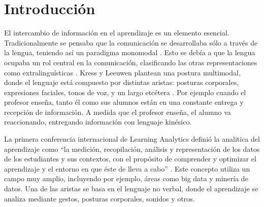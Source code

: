 \chapter{Introducción}

El intercambio de información en el aprendizaje es un elemento esencial. Tradicionalmente se pensaba que la comunicación se desarrollaba sólo a través de la lengua, teniendo así un paradigma monomodal \cite{ref1}. Esto se debía a que la lengua ocupaba un rol central en la comunicación, clasificando las otras representaciones como extralinguísticas \cite{ref1}. Kress y Leeuwen plantean una postura multimodal, donde el lenguaje está compuesto por distintas aristas: posturas corporales, expresiones faciales, tonos de voz, y un largo etcétera \cite{ref13}.
Por ejemplo cuando el profesor enseña, tanto él como sus alumnos están en una constante entrega y recepción de información. A medida que el profesor enseña, el alumno va reaccionando, entregando información con lenguaje kinésico. 

La primera conferencia internacional de Learning Analytics definió la analitica del aprendizaje como ``la medición, recopilación, análisis y representación de los datos de los estudiantes y sus contextos, con el propósito de comprender y optimizar el aprendizaje y el entorno en que éste de lleva a cabo'' \cite{ref5}. Este concepto utiliza un campo muy amplio, incluyendo por ejemplo, áreas como big data y minería de datos. Una de las aristas se basa en el lenguaje no verbal, donde el aprendizaje se analiza mediante gestos, posturas corporales, sonidos y otros.

